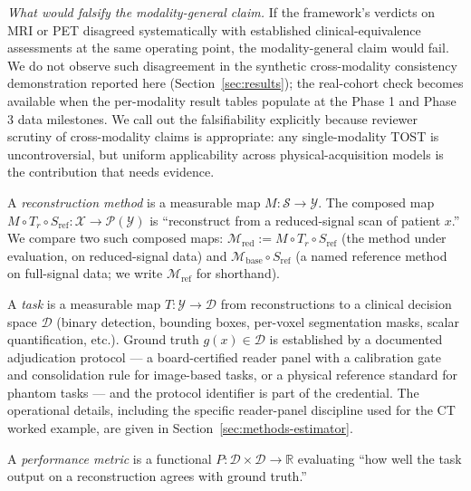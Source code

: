 \documentclass[twoside,11pt]{article}
\newcommand{\Mref}{\mathcal{M}_{\textrm{ref}}}
\newcommand{\Mred}{\mathcal{M}_{\textrm{red}}}
\newcommand{\Sref}{S_{\textrm{ref}}}
\newcommand{\R}{\mathbb{R}}
\begin{document}
\textit{What would falsify the modality-general claim.} If the framework's verdicts on MRI or PET disagreed systematically with established clinical-equivalence assessments at the same operating point, the modality-general claim would fail. We do not observe such disagreement in the synthetic cross-modality consistency demonstration reported here (Section~\ref{sec:results}); the real-cohort check becomes available when the per-modality result tables populate at the Phase 1 and Phase 3 data milestones. We call out the falsifiability explicitly because reviewer scrutiny of cross-modality claims is appropriate: any single-modality TOST is uncontroversial, but uniform applicability across physical-acquisition models is the contribution that needs evidence.

A \emph{reconstruction method} is a measurable map $M: \mathcal{S} \to \mathcal{Y}$. The composed map $M \circ T_r \circ \Sref: \mathcal{X} \to \mathcal{P}(\mathcal{Y})$ is ``reconstruct from a reduced-signal scan of patient $x$.'' We compare two such composed maps: $\Mred := M \circ T_r \circ \Sref$ (the method under evaluation, on reduced-signal data) and $\mathcal{M}_{\textrm{base}} \circ \Sref$ (a named reference method on full-signal data; we write $\Mref$ for shorthand).

A \emph{task} is a measurable map $T: \mathcal{Y} \to \mathcal{D}$ from reconstructions to a clinical decision space $\mathcal{D}$ (binary detection, bounding boxes, per-voxel segmentation masks, scalar quantification, etc.). Ground truth $g(x) \in \mathcal{D}$ is established by a documented adjudication protocol --- a board-certified reader panel with a calibration gate and consolidation rule for image-based tasks, or a physical reference standard for phantom tasks --- and the protocol identifier is part of the credential. The operational details, including the specific reader-panel discipline used for the CT worked example, are given in Section~\ref{sec:methods-estimator}.

A \emph{performance metric} is a functional $P: \mathcal{D} \times \mathcal{D} \to \R$ evaluating ``how well the task output on a reconstruction agrees with ground truth.''
\end{document}
